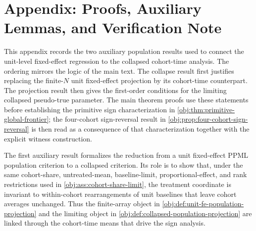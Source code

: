 \section{Appendix: Proofs, Auxiliary Lemmas, and Verification Note}

This appendix records the two auxiliary population results used to connect the unit-level fixed-effect regression to the collapsed cohort-time analysis. The ordering mirrors the logic of the main text. The collapse result first justifies replacing the finite-\(N\) unit fixed-effect projection by its cohort-time counterpart. The projection result then gives the first-order conditions for the limiting collapsed pseudo-true parameter. The main theorem proofs use these statements before establishing the primitive sign characterization in \cref{obj:thm:primitive-global-frontier}; the four-cohort sign-reversal result in \cref{obj:prop:four-cohort-sign-reversal} is then read as a consequence of that characterization together with the explicit witness construction.

The first auxiliary result formalizes the reduction from a unit fixed-effect PPML population criterion to a collapsed criterion. Its role is to show that, under the same cohort-share, untreated-mean, baseline-limit, proportional-effect, and rank restrictions used in \cref{obj:ass:cohort-share-limit}, the treatment coordinate is invariant to within-cohort rearrangements of unit baselines that leave cohort averages unchanged. Thus the finite-array object in \cref{obj:def:unit-fe-population-projection} and the limiting object in \cref{obj:def:collapsed-population-projection} are linked through the cohort-time means that drive the sign analysis.

